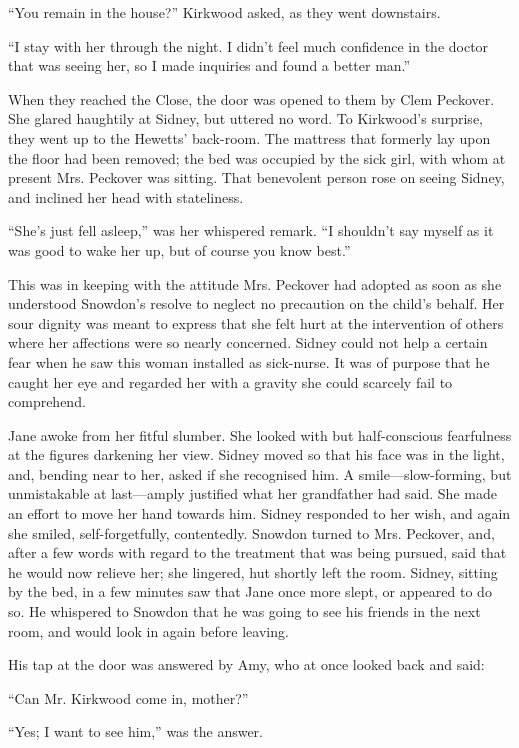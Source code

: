 ``You remain in the house?'' Kirkwood asked, as they went downstairs.

``I stay with her through the night. I didn't feel much confidence in
the doctor that was seeing her, so I made inquiries and found a better
man.''

When they reached the Close, the door was opened to them by Clem
Peckover. She glared haughtily at Sidney, but uttered no word. To
Kirkwood's surprise, they went up to the Hewetts' back-room. The
mattress that formerly lay upon the floor had been removed; the bed was
occupied by the sick girl, with whom at present Mrs. Peckover was
sitting. That benevolent person rose on seeing Sidney, and inclined her
head with stateliness.

``She's just fell asleep,'' was her whispered remark. ``I shouldn't say
myself as it was good to wake her up, but of course you know best.''

This was in keeping with the attitude Mrs. {}Peckover had adopted as
soon as she understood Snowdon's resolve to neglect no precaution on the
child's behalf. Her sour dignity was meant to express that she felt hurt
at the intervention of others where her affections were so nearly
concerned. Sidney could not help a certain fear when he saw this woman
installed as sick-nurse. It was of purpose that he caught her eye and
regarded her with a gravity she could scarcely fail to comprehend.

Jane awoke from her fitful slumber. She looked with but half-conscious
fearfulness at the figures darkening her view. Sidney moved so that his
face was in the light, and, bending near to her, asked if she recognised
him. A smile---slow-forming, but unmistakable at last---amply justified
what her grandfather had said. She made an effort to move her hand
towards him. Sidney responded to her wish, and again she smiled,
self-forgetfully, contentedly. Snowdon turned to Mrs. Peckover, and,
after a few words with regard to the {}treatment that was being pursued,
said that he would now relieve her; she lingered, hut shortly left the
room. Sidney, sitting by the bed, in a few minutes saw that Jane once
more slept, or appeared to do so. He whispered to Snowdon that he was
going to see his friends in the next room, and would look in again
before leaving.

His tap at the door was answered by Amy, who at once looked back and
said:

``Can Mr. Kirkwood come in, mother?''

``Yes; I want to see him,'' was the answer.

